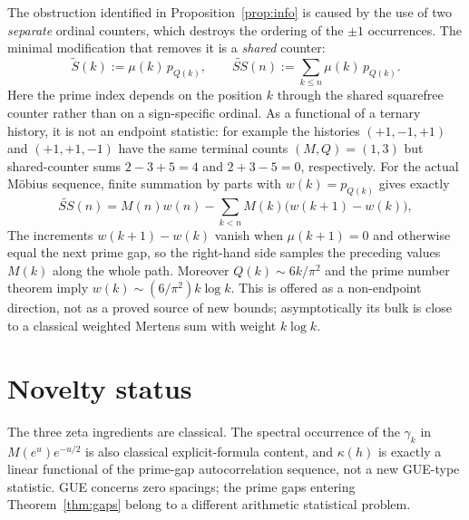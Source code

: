 \documentclass[11pt]{amsart}
\numberwithin{equation}{section}
\theoremstyle{plain}
\theoremstyle{definition}
\theoremstyle{remark}
\newcommand{\mob}{\mu}
\newcommand{\Mert}{M}
\newcommand{\Sq}{Q}
\begin{document}
The obstruction identified in Proposition~\ref{prop:info} is caused by the use
of two \emph{separate} ordinal counters, which destroys the ordering of the
$\pm1$ occurrences. The minimal modification that removes it is a
\emph{shared} counter:
\begin{equation}
\label{eq:shared-counter-definition}
\widetilde S(k):=\mob(k)\,p_{\Sq(k)},
\qquad
\widetilde{SS}(n):=\sum_{k\le n}\mob(k)\,p_{\Sq(k)} .
\end{equation}
Here the prime index depends on the position $k$ through the shared squarefree
counter rather than on a sign-specific ordinal. As a functional of a ternary history,
it is not an endpoint statistic: for example the histories $(+1,-1,+1)$ and
$(+1,+1,-1)$ have the same terminal counts $(M,Q)=(1,3)$ but shared-counter sums
$2-3+5=4$ and $2+3-5=0$, respectively. For the actual M\"obius sequence, finite
summation by parts with $w(k)=p_{\Sq(k)}$ gives exactly
\begin{equation}
\label{eq:abel-shared-counter}
\widetilde{SS}(n)=\Mert(n)w(n)-\sum_{k<n}\Mert(k)\bigl(w(k+1)-w(k)\bigr),
\end{equation}
The increments $w(k+1)-w(k)$ vanish when $\mob(k+1)=0$ and otherwise equal the
next prime gap, so the right-hand side samples the preceding values $M(k)$ along the
whole path. Moreover $Q(k)\sim6k/\pi^2$ and the prime number theorem imply
$w(k)\sim(6/\pi^2)k\log k$. This is offered as a non-endpoint direction, not as
a proved source of new bounds; asymptotically its bulk is close to a classical weighted
Mertens sum with weight $k\log k$.

\section{Novelty status}
\label{sec:novelty}

The three zeta ingredients are classical. The spectral occurrence of the
$\gamma_k$ in $M(e^u)e^{-u/2}$ is also classical explicit-formula content, and
$\kappa(h)$ is exactly a linear functional of the prime-gap autocorrelation
sequence, not a new GUE-type statistic. GUE concerns zero spacings; the prime
gaps entering Theorem~\ref{thm:gaps} belong to a different arithmetic
statistical problem.
\end{document}
